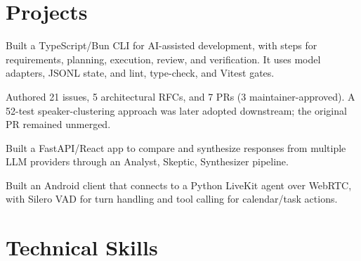 \documentclass{../../../templates/v3/resume-openfont}
\begin{document}
\section{Projects}
\begin{resumeitemize}
\item Built a TypeScript/Bun CLI for AI-assisted development, with steps for requirements, planning, execution, review, and verification. It uses model adapters, JSONL state, and lint, type-check, and Vitest gates.
\end{resumeitemize}

\begin{resumeitemize}
\item Authored 21 issues, 5 architectural RFCs, and 7 PRs (3 maintainer-approved). A 52-test speaker-clustering approach was later adopted downstream; the original PR remained unmerged.
\end{resumeitemize}

\begin{resumeitemize}
\item Built a FastAPI/React app to compare and synthesize responses from multiple LLM providers through an Analyst, Skeptic, Synthesizer pipeline.
\end{resumeitemize}

\begin{resumeitemize}
\item Built an Android client that connects to a Python LiveKit agent over WebRTC, with Silero VAD for turn handling and tool calling for calendar/task actions.
\end{resumeitemize}

\section{Technical Skills}
\end{document}
